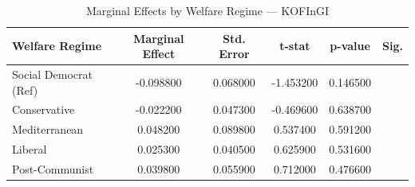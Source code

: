 \begin{table}[htbp]
\caption{Marginal Effects by Welfare Regime — KOFInGI}
\label{tab:marginal_effects_KOFInGI}
\begin{tabular}{lccccc}
\toprule
Welfare Regime & Marginal Effect & Std. Error & t-stat & p-value & Sig. \\
\midrule
Social Democrat (Ref) & -0.098800 & 0.068000 & -1.453200 & 0.146500 &  \\
Conservative & -0.022200 & 0.047300 & -0.469600 & 0.638700 &  \\
Mediterranean & 0.048200 & 0.089800 & 0.537400 & 0.591200 &  \\
Liberal & 0.025300 & 0.040500 & 0.625900 & 0.531600 &  \\
Post-Communist & 0.039800 & 0.055900 & 0.712000 & 0.476600 &  \\
\bottomrule
\end{tabular}
\end{table}
